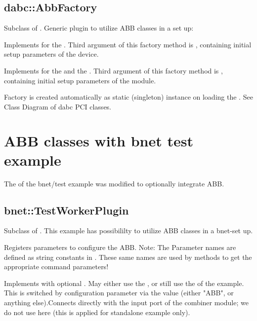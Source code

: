 \subsection{dabc::AbbFactory}
Subclass of . Generic plugin to utilize ABB classes in a set up:
\bcir
\item Implements  for the . Third argument of this factory method is , containing initial setup parameters of the device.
\item Implements  for the  and the . Third argument of this factory method is , containing initial setup parameters of the module.
\item Factory is created automatically as static (singleton) instance on loading the .
\ecir
See Class Diagram of dabc PCI classes.

\section{ABB classes with bnet test example}
The  of the bnet/test example was modified to optionally integrate ABB.

\subsection{bnet::TestWorkerPlugin}
Subclass of . This example has possibililty to utilize ABB classes in a bnet-set up.
\bcir
\item Registers parameters to configure the ABB. Note: The Parameter names are defined as string constants in . These same names are used by  methods to get the appropriate command parameters!
\item Implements  with optional . May either use the , or still use the  of the example. This is switched by configuration parameter via the  value (either "ABB", or anything else).Connects  directly with the input port of the combiner module; we do not use  here (this is applied for standalone example  only).
\ecir
